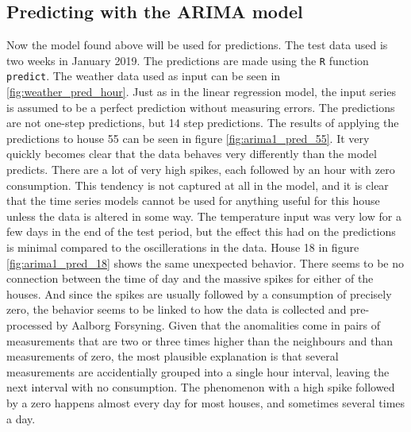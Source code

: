 \subsection{Predicting with the ARIMA model}
Now the model found above will be used for predictions. The test data used is two weeks in January 2019. The predictions are made using the \texttt{R} function \texttt{predict}. The  weather data used as input can be seen in \cref{fig:weather_pred_hour}. Just as in the linear regression model, the input series is assumed to be a perfect prediction without measuring errors. The predictions are not one-step predictions, but 14 step predictions. The results of applying the predictions to house 55 can be seen in figure \cref{fig:arima1_pred_55}. It very quickly becomes clear that the data behaves very differently than the model predicts. There are a lot of very high spikes, each followed by an hour with zero consumption. This tendency is not captured at all in the model, and it is clear that the time series models cannot be used for anything useful for this house unless the data is altered in some way. The temperature input was very low for a few days in the end of the test period, but the effect this had on the predictions is minimal compared to the oscillerations in the data. House 18 in figure \cref{fig:arima1_pred_18} shows the same unexpected behavior. There seems to be no connection between the time of day and the massive spikes for either of the houses. And since the spikes are usually followed by a consumption of precisely zero, the behavior seems to be linked to how the data is collected and pre-processed by Aalborg Forsyning. Given that the anomalities come in pairs of measurements that are two or three times higher than the neighbours and than measurements of zero, the most plausible explanation is that several measurements are accidentially grouped into a single hour interval, leaving the next interval with no consumption. The phenomenon with a high spike followed by a zero happens almost every day for most houses, and sometimes several times a day.

